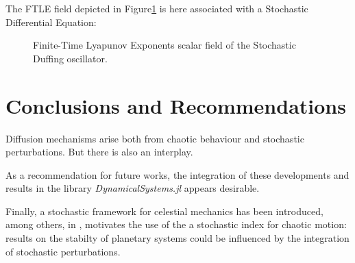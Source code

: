 \documentclass{juliacon}
\begin{document}
The FTLE field depicted in Figure\ref{fig:duff} is here associated with a Stochastic Differential Equation:

\begin{figure}[h]
    \centering
    \caption{Finite-Time Lyapunov Exponents scalar field of the Stochastic Duffing oscillator.}\label{fig:duff}
\end{figure}

\section{Conclusions and Recommendations}
Diffusion mechanisms arise both from chaotic behaviour and stochastic perturbations. 
But there is also an interplay.

As a recommendation for future works, the integration of these developments 
and results in the library \textit{DynamicalSystems.jl} appears desirable.

Finally, a stochastic framework for celestial mechanics has been introduced, among others, in \cite{manzibosch}, motivates the use of the a stochastic index for chaotic motion:
results on the stabilty of planetary systems could be influenced by the integration of stochastic perturbations.


\end{document}
